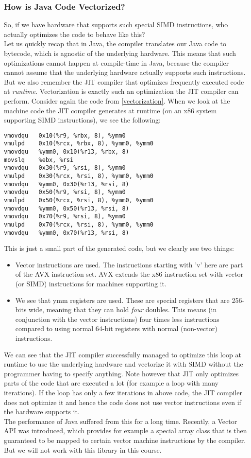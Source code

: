 \documentclass[main.tex]{subfiles}
\begin{document}
\subsubsection{How is Java Code Vectorized?}
So, if we have hardware that supports such special SIMD instructions, who actually optimizes the code to behave like this?\\
Let us quickly recap that in Java, the compiler translates our Java code to bytecode, which is agnostic of the underlying hardware. This means that such optimizations cannot happen at compile-time in Java, because the compiler cannot assume that the underlying hardware actually supports such instructions. But we also remember the JIT compiler that optimizes frequently executed code at \textit{runtime}. Vectorization is exactly such an optimization the JIT compiler can perform. Consider again the code from \ref{vectorization}. When we look at the machine code the JIT compiler generates at runtime (on an x86 system supporting SIMD instructions), we see the following:
\begin{verbatim}
vmovdqu   0x10(%r9, %rbx, 8), %ymm0
vmulpd    0x10(%rcx, %rbx, 8), %ymm0, %ymm0
vmovdqu   %ymm0, 0x10(%r13, %rbx, 8)
movslq    %ebx, %rsi
vmovdqu   0x30(%r9, %rsi, 8), %ymm0
vmulpd    0x30(%rcx, %rsi, 8), %ymm0, %ymm0
vmovdqu   %ymm0, 0x30(%r13, %rsi, 8)
vmovdqu   0x50(%r9, %rsi, 8), %ymm0
vmulpd    0x50(%rcx, %rsi, 8), %ymm0, %ymm0
vmovdqu   %ymm0, 0x50(%r13, %rsi, 8)
vmovdqu   0x70(%r9, %rsi, 8), %ymm0
vmulpd    0x70(%rcx, %rsi, 8), %ymm0, %ymm0
vmovdqu   %ymm0, 0x70(%r13, %rsi, 8)
\end{verbatim}
This is just a small part of the generated code, but we clearly see two things:
\begin{itemize}
  \item Vector instructions are used. The instructions starting with 'v' here are part of the AVX instruction set. AVX extends the x86 instruction set with vector (or SIMD) instructions for machines supporting it.
  \item We see that ymm registers are used. These are special registers that are 256-bits wide, meaning that they can hold \textit{four} doubles. This means (in conjunction with the vector instructions) four times less instructions compared to using normal 64-bit registers with normal (non-vector) instructions.
\end{itemize}
We can see that the JIT compiler successfully managed to optimize this loop at runtime to use the underlying hardware and vectorize it with SIMD without the programmer having to specify anything. Note however that JIT only optimizes parts of the code that are executed a lot (for example a loop with many iterations). If the loop has only a few iterations in above code, the JIT compiler does not optimize it and hence the code does not use vector instructions even if the hardware supports it.\\
The performance of Java suffered from this for a long time. Recently, a Vector API was introduced, which provides for example a special array class that is then guaranteed to be mapped to certain vector machine instructions by the compiler. But we will not work with this library in this course.
\end{document}
